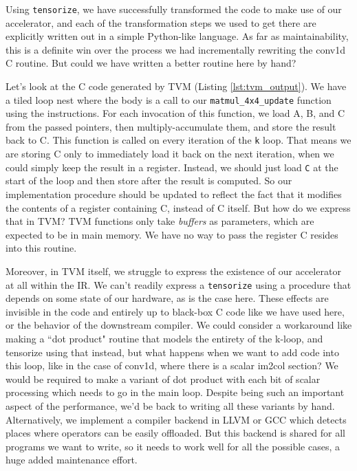 \documentclass[acmsmall, nonacm=true]{acmart}
\begin{document}
Using \verb|tensorize|, we have successfully transformed the code to make use of our accelerator, and each of the transformation steps we used to get there are explicitly written out in a simple Python-like language. As far as maintainability, this is a definite win over the process we had incrementally rewriting the conv1d C routine. But could we have written a better routine here by hand? 

Let's look at the C code generated by TVM (Listing \ref{lst:tvm_output}). We have a tiled loop nest where the body is a call to our \verb|matmul_4x4_update| function using the instructions. For each invocation of this function, we load A, B, and C from the passed pointers, then multiply-accumulate them, and store the result back to C.  This function is called on every iteration of the \verb|k| loop. That means we are storing C only to immediately load it back on the next iteration, when we could simply keep the result in a register. Instead, we should just load \verb|C| at the start of the loop and then store after the result is computed. So our implementation procedure should be updated to reflect the fact that it modifies the contents of a register containing C, instead of C itself. But how do we express that in TVM? TVM functions only take \textit{buffers} as parameters, which are expected to be in main memory. We have no way to pass the register C resides into this routine.

Moreover, in TVM itself, we struggle to express the existence of our accelerator at all within the IR. We can't readily express a \verb|tensorize| using a procedure that depends on some state of our hardware, as is the case here. These effects are invisible in the code and entirely up to black-box C code like we have used here, or the behavior of the downstream compiler. We could consider a workaround like making a ``dot product" routine that models the entirety of the k-loop, and tensorize using that instead, but what happens when we want to add code into this loop, like in the case of conv1d, where there is a scalar im2col section? We would be required to make a variant of dot product with each bit of scalar processing which needs to go in the main loop. Despite being such an important aspect of the performance, we'd be back to writing all these variants by hand. Alternatively, we implement a compiler backend in LLVM or GCC which detects places where operators can be easily offloaded. But this backend is shared for all programs we want to write, so it needs to work well for all the possible cases, a huge added maintenance effort.
\end{document}
